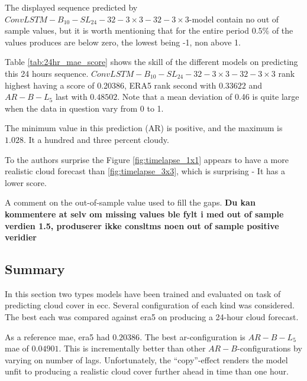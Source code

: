 The displayed sequence predicted by $ConvLSTM-B_{10}-SL_{24}-32-3\times3-32-3 \times3$-model contain no out of sample values, but it is worth mentioning that for the entire period $0.5\%$ of the values produces are below zero, the lowest being -1, non above 1. 

Table \ref{tab:24hr_mae_score} shows the skill of the different models on predicting this 24 hours sequence. $ConvLSTM-B_{10}-SL_{24}-32-3\times3-32-3\times3$ rank highest having a score of 0.20386, ERA5 rank second with  $0.33622$ and $AR-B-L_5$ last with  $0.48502$. Note that a mean deviation of 0.46 is quite large when the data in question vary from 0 to 1. 


The minimum value in this prediction (AR) is positive, and the maximum is $1.028$. It a hundred and three percent cloudy. 

To the authors surprise the Figure \ref{fig:timelapse_1x1} appears to have a more realistic cloud forecast than \ref{fig:timelapse_3x3}, which is surprising - It has a lower score.

A comment on the out-of-sample value used to fill the gaps.
\textbf{Du kan kommentere at selv om missing values ble fylt i med out of sample verdien 1.5, produserer ikke consltms noen out of sample positive veridier}




\subsection{Summary} \label{sec:summary_num}
In this section %
two types models have been trained and evaluated on task of predicting cloud cover in \acrshort{ecc}.
Several configuration of each kind was considered. The best each was compared against \acrshort{era5} on producing a 24-hour cloud forecast.

As a reference \acrshort{mae}, \acrshort{era5} had $0.20386$. 
The best \acrshort{ar}-configuration is $AR-B-L_5$ \acrshort{mae} of $0.04901$. This is incrementally better than other $AR-B$-configurations by varying on number of lags. Unfortunately, the ``copy''-effect renders the model unfit to producing a realistic cloud cover further ahead in time than one hour. 

